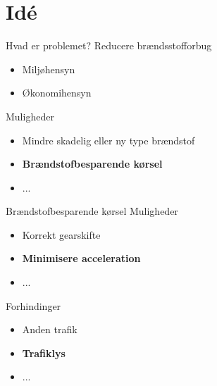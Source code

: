 \section{Idé}

\begin{frame}{Hvad er problemet?}
Reducere brændsstofforbug
\begin{itemize}
\item Miljøhensyn
\item Økonomihensyn
\end{itemize}

Muligheder
\begin{itemize}
\item Mindre skadelig eller ny type brændstof
\item \textbf{Brændstofbesparende kørsel}
\item ...
\end{itemize}
\end{frame}

\begin{frame}{Brændstofbesparende kørsel}
Muligheder
\begin{itemize}
\item Korrekt gearskifte
\item \textbf{Minimisere acceleration}
\item ...
\end{itemize}

Forhindinger
\begin{itemize}
\item Anden trafik
\item \textbf{Trafiklys}
\item ...
\end{itemize}

\end{frame}

